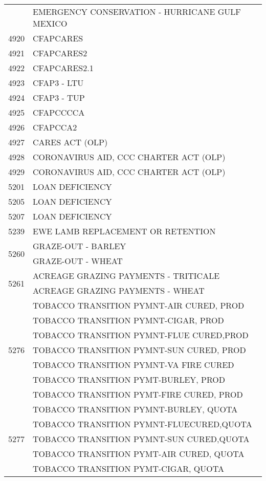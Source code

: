 \begin{longtable}{ll}
 & EMERGENCY CONSERVATION - HURRICANE GULF MEXICO \\
\cline{1-2}
4920 & CFAPCARES \\
\cline{1-2}
4921 & CFAPCARES2 \\
\cline{1-2}
4922 & CFAPCARES2.1 \\
\cline{1-2}
4923 & CFAP3 - LTU \\
\cline{1-2}
4924 & CFAP3 - TUP \\
\cline{1-2}
4925 & CFAPCCCCA \\
\cline{1-2}
4926 & CFAPCCA2 \\
\cline{1-2}
4927 & CARES ACT (OLP) \\
\cline{1-2}
4928 & CORONAVIRUS AID, CCC CHARTER ACT (OLP) \\
\cline{1-2}
4929 & CORONAVIRUS AID, CCC CHARTER ACT (OLP) \\
\cline{1-2}
5201 & LOAN DEFICIENCY \\
\cline{1-2}
5205 & LOAN DEFICIENCY \\
\cline{1-2}
5207 & LOAN DEFICIENCY \\
\cline{1-2}
5239 & EWE LAMB REPLACEMENT OR RETENTION \\
\cline{1-2}
\multirow[t]{2}{*}{5260} & GRAZE-OUT - BARLEY \\
 & GRAZE-OUT - WHEAT \\
\cline{1-2}
\multirow[t]{2}{*}{5261} & ACREAGE GRAZING PAYMENTS - TRITICALE \\
 & ACREAGE GRAZING PAYMENTS - WHEAT \\
\cline{1-2}
\multirow[t]{7}{*}{5276} & TOBACCO TRANSITION PYMNT-AIR CURED, PROD \\
 & TOBACCO TRANSITION PYMNT-CIGAR, PROD \\
 & TOBACCO TRANSITION PYMNT-FLUE CURED,PROD \\
 & TOBACCO TRANSITION PYMNT-SUN CURED, PROD \\
 & TOBACCO TRANSITION PYMNT-VA FIRE CURED \\
 & TOBACCO TRANSITION PYMT-BURLEY, PROD \\
 & TOBACCO TRANSITION PYMT-FIRE CURED, PROD \\
\cline{1-2}
\multirow[t]{6}{*}{5277} & TOBACCO TRANSITION PYMNT-BURLEY, QUOTA \\
 & TOBACCO TRANSITION PYMNT-FLUECURED,QUOTA \\
 & TOBACCO TRANSITION PYMNT-SUN CURED,QUOTA \\
 & TOBACCO TRANSITION PYMT-AIR CURED, QUOTA \\
 & TOBACCO TRANSITION PYMT-CIGAR, QUOTA \\

\end{longtable}
